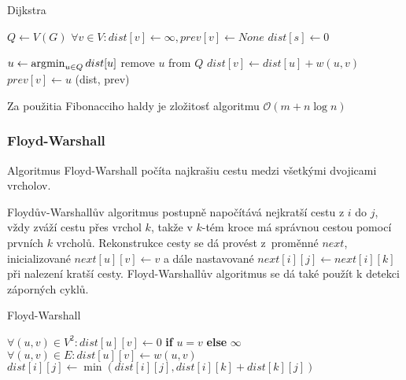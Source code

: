 \begin{algorithm}[h]
\caption{Dijkstra}
\begin{algorithmic}[1]
    \State $Q \gets V(G)$
    \State $\forall v \in V : dist[v] \gets \infty, prev[v] \gets None$
    \State $dist[s] \gets 0$

        \State $u \gets \operatorname*{\arg\!\min}_{u \in Q} dist[u]$
        \State remove $u$ from $Q$
                \State $dist[v] \gets dist[u] + w(u,v) $
                \State $prev[v] \gets u$
            \EndIf
        \EndFor
    \EndWhile
    \State \Return (dist, prev)
\EndFunction
\end{algorithmic}
\end{algorithm}

Za použitia Fibonacciho haldy je zložitosť algoritmu $\mathcal{O}(m + n \log n)$

\subsubsection{Floyd-Warshall}

Algoritmus Floyd-Warshall počíta najkrašiu cestu medzi všetkými
dvojicami vrcholov.

Floydův-Warshallův algoritmus postupně napočítává nejkratší cestu z $i$
do $j$, vždy zváží cestu přes vrchol $k$, takže v $k$-tém kroce
má správnou cestou pomocí prvních $k$ vrcholů.
Rekonstrukce cesty se dá provést z~proměnné $next$, inicializované
$next[u][v] \gets v$ a dále nastavované $next[i][j] \gets next[i][k]$
při nalezení kratší cesty.
Floyd-Warshallův algoritmus se dá také použít k detekci záporných cyklů.

\begin{algorithm}[H]
\caption{Floyd-Warshall}
\begin{algorithmic}[1]
    \State $\forall (u,v) \in V^2 : dist[u][v] \gets 0$
        \textbf{if} $u = v$ \textbf{else} $\infty$
    \State $\forall (u,v) \in E : dist[u][v] \gets w(u,v)$
                \State $dist[i][j] \gets \min(dist[i][j], dist[i][k] + dist[k][j])$
            \EndFor
        \EndFor
    \EndFor
\EndFunction
\end{algorithmic}
\end{algorithm}

